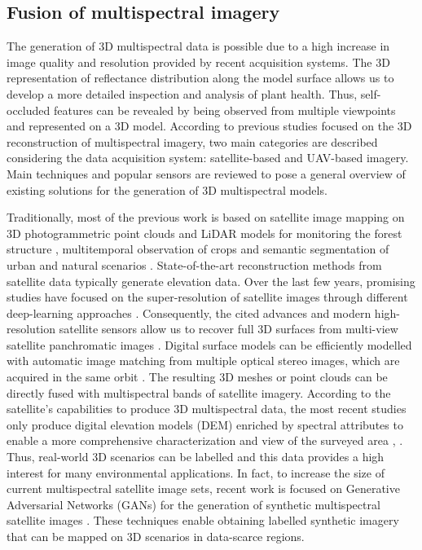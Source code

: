 \subsection{Fusion of multispectral imagery}

The generation of 3D multispectral data is possible due to a high increase in image quality and resolution provided by recent acquisition systems. The 3D representation of reflectance distribution along the model surface allows us to develop a more detailed inspection and analysis of plant health. Thus, self-occluded features can be revealed by being observed from multiple viewpoints and represented on a 3D model. According to previous studies focused on the 3D reconstruction of multispectral imagery, two main categories are described considering the data acquisition system: satellite-based and UAV-based imagery. Main techniques and popular sensors are reviewed to pose a general overview of existing solutions for the generation of 3D multispectral models.

Traditionally, most of the previous work is based on satellite image mapping on 3D photogrammetric point clouds and LiDAR models for monitoring the forest structure \cite{bolton_optimizing_2020, lechner_applications_2020}, multitemporal observation of crops \cite{gadiraju_multimodal_2020, qadeer_spatio-temporal_2021} and semantic segmentation of urban and natural scenarios \cite{ballouch_toward_2022, saralioglu_semantic_2020}. State-of-the-art reconstruction methods from satellite data typically generate elevation data. Over the last few years, promising studies have focused on the super-resolution of satellite images through different deep-learning approaches \cite{gomez_experimental_2022, stucker_resdepth_2022}. Consequently, the cited advances and modern high-resolution satellite sensors allow us to recover full 3D surfaces from multi-view satellite panchromatic images \cite{han_state_2020, rothermel_photometric_2020}. Digital surface models can be efficiently modelled with automatic image matching from multiple optical stereo images, which are acquired in the same orbit \cite{gui_automated_2021, qin_critical_2019}. The resulting 3D meshes or point clouds can be directly fused with multispectral bands of satellite imagery. According to the satellite's capabilities to produce 3D multispectral data, the most recent studies only produce digital elevation models (DEM) enriched by spectral attributes to enable a more comprehensive characterization and view of the surveyed area \cite{dalponte_mapping_2020}, \cite{sagan_field-scale_2021, wang_extraction_2020}. Thus, real-world 3D scenarios can be labelled and this data provides a high interest for many environmental applications. In fact, to increase the size of current multispectral satellite image sets, recent work is focused on Generative Adversarial Networks (GANs) for the generation of synthetic multispectral satellite images \cite{abady_gan_2020, mohandoss_generating_2020}. These techniques enable obtaining labelled synthetic imagery that can be mapped on 3D scenarios in data-scarce regions.


